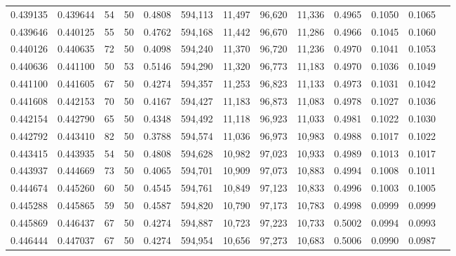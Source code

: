 \begin{tabular}{rrrrrrrrrrrrr}
0.439135 & 0.439644 &    54 &  50 &                                     0.4808 & 594,113 &  11,497 &  96,620 &  11,336 & 0.4965 & 0.1050 & 0.1065 \\
0.439646 & 0.440125 &    55 &  50 &                                     0.4762 & 594,168 &  11,442 &  96,670 &  11,286 & 0.4966 & 0.1045 & 0.1060 \\
0.440126 & 0.440635 &    72 &  50 &                                     0.4098 & 594,240 &  11,370 &  96,720 &  11,236 & 0.4970 & 0.1041 & 0.1053 \\
0.440636 & 0.441100 &    50 &  53 &                                     0.5146 & 594,290 &  11,320 &  96,773 &  11,183 & 0.4970 & 0.1036 & 0.1049 \\
0.441100 & 0.441605 &    67 &  50 &                                     0.4274 & 594,357 &  11,253 &  96,823 &  11,133 & 0.4973 & 0.1031 & 0.1042 \\
0.441608 & 0.442153 &    70 &  50 &                                     0.4167 & 594,427 &  11,183 &  96,873 &  11,083 & 0.4978 & 0.1027 & 0.1036 \\
0.442154 & 0.442790 &    65 &  50 &                                     0.4348 & 594,492 &  11,118 &  96,923 &  11,033 & 0.4981 & 0.1022 & 0.1030 \\
0.442792 & 0.443410 &    82 &  50 &                                     0.3788 & 594,574 &  11,036 &  96,973 &  10,983 & 0.4988 & 0.1017 & 0.1022 \\
0.443415 & 0.443935 &    54 &  50 &                                     0.4808 & 594,628 &  10,982 &  97,023 &  10,933 & 0.4989 & 0.1013 & 0.1017 \\
0.443937 & 0.444669 &    73 &  50 &                                     0.4065 & 594,701 &  10,909 &  97,073 &  10,883 & 0.4994 & 0.1008 & 0.1011 \\
0.444674 & 0.445260 &    60 &  50 &                                     0.4545 & 594,761 &  10,849 &  97,123 &  10,833 & 0.4996 & 0.1003 & 0.1005 \\
0.445288 & 0.445865 &    59 &  50 &                                     0.4587 & 594,820 &  10,790 &  97,173 &  10,783 & 0.4998 & 0.0999 & 0.0999 \\
0.445869 & 0.446437 &    67 &  50 &                                     0.4274 & 594,887 &  10,723 &  97,223 &  10,733 & 0.5002 & 0.0994 & 0.0993 \\
0.446444 & 0.447037 &    67 &  50 &                                     0.4274 & 594,954 &  10,656 &  97,273 &  10,683 & 0.5006 & 0.0990 & 0.0987 \\

\end{tabular}
